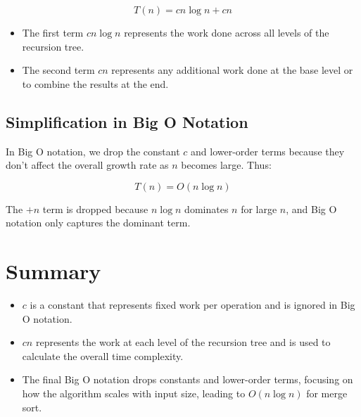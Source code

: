 \documentclass{article}
\begin{document}
\[
T(n) = cn \log n + cn
\]

\begin{itemize}
    \item The first term \( cn \log n \) represents the work done across all levels of the recursion tree.
    \item The second term \( cn \) represents any additional work done at the base level or to combine the results at the end.
\end{itemize}

\subsection*{Simplification in Big O Notation}
In Big O notation, we drop the constant \( c \) and lower-order terms because they don't affect the overall growth rate as \( n \) becomes large. Thus:

\[
T(n) = O(n \log n)
\]

The \( +n \) term is dropped because \( n \log n \) dominates \( n \) for large \( n \), and Big O notation only captures the dominant term.

\section*{Summary}
\begin{itemize}
    \item \( c \) is a constant that represents fixed work per operation and is ignored in Big O notation.
    \item \( cn \) represents the work at each level of the recursion tree and is used to calculate the overall time complexity.
    \item The final Big O notation drops constants and lower-order terms, focusing on how the algorithm scales with input size, leading to \( O(n \log n) \) for merge sort.
\end{itemize}
\end{document}

